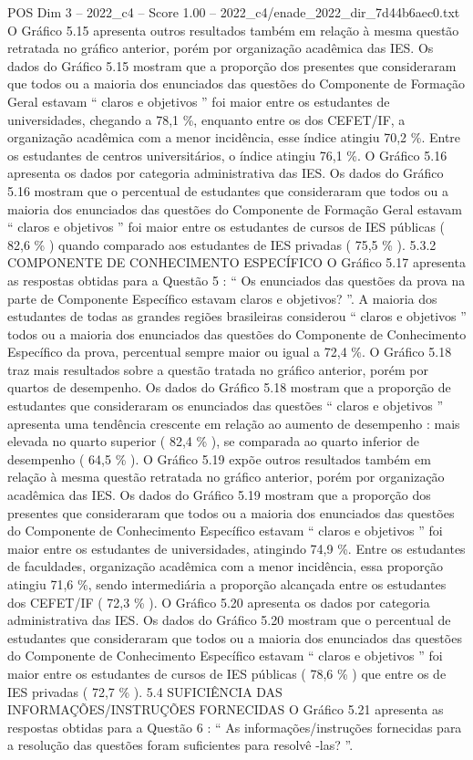 \begin{textsample}{POS Dim 3 – 2022\_c4 – Score 1.00 – 2022\_c4/enade\_2022\_dir\_7d44b6aec0.txt}
O Gráfico 5.15 apresenta outros resultados também em relação à mesma questão retratada no gráfico anterior, porém por organização acadêmica das IES.
Os dados do Gráfico 5.15 mostram que a proporção dos presentes que consideraram que todos ou a maioria dos enunciados das questões do Componente de Formação Geral estavam “ claros e objetivos ” foi maior entre os estudantes de universidades, chegando a 78,1 \%, enquanto entre os dos CEFET/IF, a organização acadêmica com a menor incidência, esse índice atingiu 70,2 \%.
Entre os estudantes de centros universitários, o índice atingiu 76,1 \%.
O Gráfico 5.16 apresenta os dados por categoria administrativa das IES.
Os dados do Gráfico 5.16 mostram que o percentual de estudantes que consideraram que todos ou a maioria dos enunciados das questões do Componente de Formação Geral estavam “ claros e objetivos ” foi maior entre os estudantes de cursos de IES públicas ( 82,6 \% ) quando comparado aos estudantes de IES privadas ( 75,5 \% ). 5.3.2 COMPONENTE DE CONHECIMENTO ESPECÍFICO O Gráfico 5.17 apresenta as respostas obtidas para a Questão 5 : “ Os enunciados das questões da prova na parte de Componente Específico estavam claros e objetivos? ”.
A maioria dos estudantes de todas as grandes regiões brasileiras considerou “ claros e objetivos ” todos ou a maioria dos enunciados das questões do Componente de Conhecimento Específico da prova, percentual sempre maior ou igual a 72,4 \%.
O Gráfico 5.18 traz mais resultados sobre a questão tratada no gráfico anterior, porém por quartos de desempenho.
Os dados do Gráfico 5.18 mostram que a proporção de estudantes que consideraram os enunciados das questões “ claros e objetivos ” apresenta uma tendência crescente em relação ao aumento de desempenho : mais elevada no quarto superior ( 82,4 \% ), se comparada ao quarto inferior de desempenho ( 64,5 \% ).
O Gráfico 5.19 expõe outros resultados também em relação à mesma questão retratada no gráfico anterior, porém por organização acadêmica das IES.
Os dados do Gráfico 5.19 mostram que a proporção dos presentes que consideraram que todos ou a maioria dos enunciados das questões do Componente de Conhecimento Específico estavam “ claros e objetivos ” foi maior entre os estudantes de universidades, atingindo 74,9 \%.
Entre os estudantes de faculdades, organização acadêmica com a menor incidência, essa proporção atingiu 71,6 \%, sendo intermediária a proporção alcançada entre os estudantes dos CEFET/IF ( 72,3 \% ).
O Gráfico 5.20 apresenta os dados por categoria administrativa das IES.
Os dados do Gráfico 5.20 mostram que o percentual de estudantes que consideraram que todos ou a maioria dos enunciados das questões do Componente de Conhecimento Específico estavam “ claros e objetivos ” foi maior entre os estudantes de cursos de IES públicas ( 78,6 \% ) que entre os de IES privadas ( 72,7 \% ). 5.4 SUFICIÊNCIA DAS INFORMAÇÕES/INSTRUÇÕES FORNECIDAS O Gráfico 5.21 apresenta as respostas obtidas para a Questão 6 : “ As informações/instruções fornecidas para a resolução das questões foram suficientes para resolvê -las? ”.

\end{textsample}

